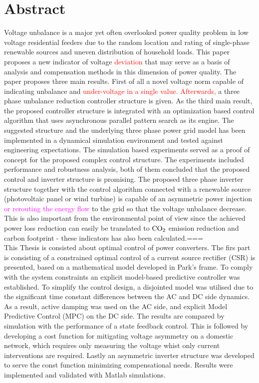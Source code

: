 \chapter*{Abstract}
\thispagestyle{plain}
     Voltage unbalance is a major yet often overlooked power quality problem in low voltage residential feeders due to the random location and rating of single-phase renewable sources and uneven distribution of household loads. This paper proposes a new indicator of voltage \textcolor{red}{deviation} that may serve as a basis of analysis and compensation methods in this dimension of power quality. The paper proposes three main results. First of all a novel voltage norm capable of indicating unbalance and \textcolor{red}{under-voltage in a single value. Afterwards,} a three phase unbalance reduction controller structure is given. As the third main result, the proposed controller structure is integrated with an optimization based control algorithm that uses asynchronous parallel pattern search as its engine. The suggested structure and the underlying three phase power grid model has been implemented in a dynamical simulation environment and tested against engineering expectations.
    The simulation based experiments served as a proof of concept for the proposed complex control structure. The experiments included performance and robustness analysis, both of them concluded that the proposed control and inverter structure is promising.
    The proposed three phase inverter structure together with the control algorithm connected with a renewable source (photovoltaic panel or wind turbine) is capable of an asymmetric power injection \textcolor{magenta}{or rerouting the energy flow} to the grid so that the voltage unbalance decrease. This is also important from the environmental point of view since the achieved power loss reduction can easily be translated to $\textnormal{CO}_2$ emission reduction and carbon footprint - these indicators has also been calculated.===\\ 
    This Thesis is consisted about optimal control of power converters. The firs part is consisting of a constrained optimal control of a current source rectifier (CSR) is presented, based on a mathematical model developed in Park's frame. To comply with the system constraints an explicit model-based predictive controller was established. To simplify the control design, a disjointed model was utilised due to the significant time constant differences between the AC and DC side dynamics. As a result, active damping was used on the AC side, and explicit Model Predictive Control (MPC) on the DC side. The results are compared by simulation with the performance of a state feedback control. This is followed by developing a cost function for mitigating voltage asymmetry on a domestic network, which requires only measuring the voltage whist only current interventions are required. Lastly an asymmetric inverter structure was developed to serve the const function minimizing compensational needs. Results were implemented and validated with Matlab simulations.

%


